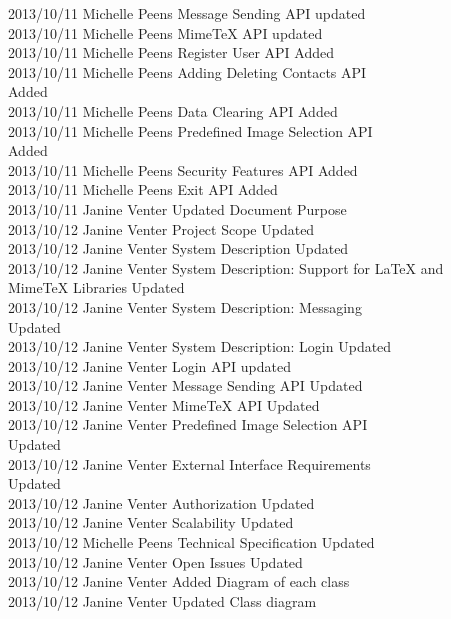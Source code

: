 \documentclass[29pt,a4paper]{moderncv}
\begin{document}
\begin{tabbing}
2013/10/11  \> Michelle Peens \> Message Sending API updated\\
2013/10/11  \> Michelle Peens \> MimeTeX API updated\\
2013/10/11  \> Michelle Peens \> Register User API Added\\
2013/10/11  \> Michelle Peens \> Adding Deleting Contacts API \\ \> \> \> Added\\
2013/10/11  \> Michelle Peens \> Data Clearing API Added\\
2013/10/11  \> Michelle Peens \> Predefined Image Selection API \\ \> \> \> Added\\
2013/10/11  \> Michelle Peens \> Security Features API Added\\
2013/10/11  \> Michelle Peens \> Exit API Added\\
2013/10/11  \> Janine Venter \> Updated Document Purpose\\
2013/10/12  \> Janine Venter \> Project Scope Updated\\
2013/10/12  \> Janine Venter \> System Description Updated\\
2013/10/12  \> Janine Venter \> System Description: Support for LaTeX and \\ \> \> \> MimeTeX Libraries Updated\\
2013/10/12  \> Janine Venter \> System Description: Messaging \\ \> \> \> Updated\\
2013/10/12  \> Janine Venter \> System Description: Login Updated\\
2013/10/12  \> Janine Venter \> Login API updated\\
2013/10/12  \> Janine Venter \> Message Sending API Updated\\
2013/10/12  \> Janine Venter \> MimeTeX API Updated\\
2013/10/12  \> Janine Venter \> Predefined Image Selection API \\ \> \> \> Updated\\
2013/10/12  \> Janine Venter \> External Interface Requirements \\ \> \> \> Updated\\
2013/10/12  \> Janine Venter \> Authorization Updated \\
2013/10/12  \> Janine Venter \> Scalability Updated \\
2013/10/12  \> Michelle Peens \> Technical Specification Updated \\
2013/10/12  \> Janine Venter \> Open Issues Updated \\
2013/10/12  \> Janine Venter \> Added Diagram of each class\\
2013/10/12  \> Janine Venter \> Updated Class diagram\\

\end{tabbing}
\end{document}
